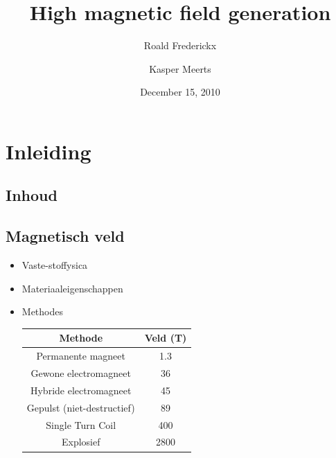 \documentclass{beamer}
\title{High magnetic field generation}
\author{Roald Frederickx \and Kasper Meerts}
\date{December 15, 2010}
\begin{document}
\begin{frame}
\titlepage
\end{frame}

\section{Inleiding}
\subsection{Inhoud}
\begin{frame}
\tableofcontents[hideallsubsections]
\end{frame}

\subsection{Magnetisch veld}
\begin{frame}
\begin{itemize}
\item Vaste-stoffysica
\item Materiaaleigenschappen
\item Methodes
\begin{table}
\begin{center}
\begin{tabular}{c|c}
Methode & Veld (T) \\
\hline
Permanente magneet & 1.3\\
Gewone electromagneet & 36\\
Hybride electromagneet & 45\\
Gepulst (niet-destructief) & 89\\
Single Turn Coil & 400\\
Explosief & 2800 \\
\end{tabular}
\end{center}
\end{table}
\end{itemize}
\end{frame}
\end{document}
